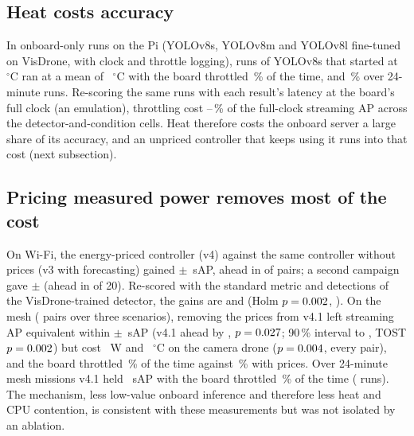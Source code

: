 \documentclass[conference]{IEEEtran}
\begin{document}
\subsection{Heat costs accuracy}\label{sec:heat}
In onboard-only runs on the Pi (YOLOv8s, YOLOv8m and YOLOv8l fine-tuned on VisDrone, with clock and throttle logging),
runs of YOLOv8s that started at \ThrottleStartCool~$^\circ$C ran at a mean of \ThrottleTempCool~$^\circ$C with the board
throttled \ThrottleShareCool\,\% of the time, and \ThrottleShareLong\,\% over 24-minute runs. Re-scoring the same runs
with each result's latency at the board's full clock (an emulation), throttling cost \ThrottleLossMin--\ThrottleLossMax\,\%
of the full-clock streaming AP across the \ThrottleCells{} detector-and-condition cells. Heat therefore costs the onboard server a
large share of its accuracy, and an unpriced controller that keeps using it runs into that cost (next subsection).

\subsection{Pricing measured power removes most of the cost}\label{sec:energy}
On Wi-Fi, the energy-priced controller (v4) against the same controller without prices (v3 with forecasting) gained
\EnGain{}$\pm$\EnGainCi{}~sAP, ahead in \EnWins{} of \EnPairs{} pairs; a second campaign gave
\EnRepGain{}$\pm$\EnRepCi{} (ahead in \EnRepWins{} of 20). Re-scored with the standard metric and detections of the
VisDrone-trained detector, the gains are \EnVdGain{} and \EnRepVdGain{} (Holm $p=0.002{}$, \EnRepVdHolm{}). On the
mesh (\MeshPairs{} pairs over three scenarios), removing the prices from v4.1 left streaming AP equivalent within $\pm$\EqMargin~sAP
(v4.1 ahead by \MeshNoPriceSap{}, $p=0.027{}$; 90\,\% interval \EqNoPriceLo{} to \EqNoPriceHi, TOST $p=0.002$) but cost \MeshNoPriceW{}~W and \MeshNoPriceC{}~$^\circ$C on the
camera drone ($p=0.004{}$, every pair), and the board throttled \MeshNoPriceThrottle{}\,\% of the time against
\MeshVThrottle{}\,\% with prices. Over 24-minute mesh missions v4.1 held \MeshLongSap{}~sAP with the board throttled
\MeshLongThrottle{}\,\% of the time (\MeshLongN{} runs). The mechanism, less low-value onboard inference and therefore
less heat and CPU contention, is consistent with these measurements but was not isolated by an ablation.
\end{document}

